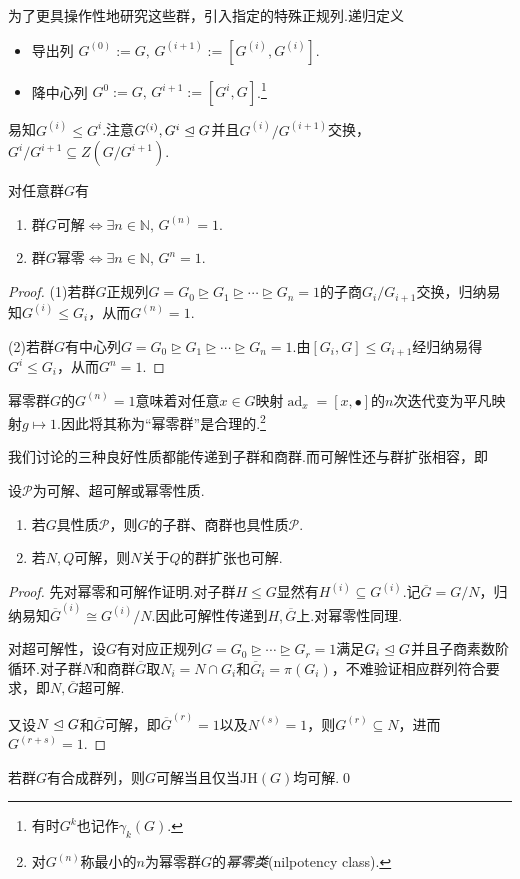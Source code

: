 为了更具操作性地研究这些群，引入指定的特殊正规列.递归定义
\begin{itemize}
	\item {\heiti 导出列} $G^{(0)}:=G,\,G^{(i+1)}:=[G^{(i)},G^{(i)}]$.
	\item {\heiti 降中心列} $G^0:=G,\,G^{i+1}:=[G^i,G]$.\footnote{有时$G^k$也记作$\gamma_k(G)$.}
\end{itemize}


易知$G^{(i)}\le G^i$.注意$G^{(i)},G^i\trianglelefteq G$并且$G^{(i)}/G^{(i+1)}$交换，$G^i/G^{i+1}\subseteq Z(G/G^{i+1})$.
\begin{prop}
	对任意群$G$有
	\begin{enumerate}
		\item 群$G$可解$\iff\exists n\in\mathbb{N},\,G^{(n)}=1$.
		\item 群$G$幂零$\iff\exists n\in\mathbb{N},\,G^n=1$.
	\end{enumerate}
\end{prop}
\begin{proof}
	\hspace*{5.4pt}(1)若群$G$正规列$G=G_0\trianglerighteq G_1\trianglerighteq\cdots\trianglerighteq G_n=1$的子商$G_{i}/G_{i+1}$交换，归纳易知$G^{(i)}\le G_i$，从而$G^{(n)}=1$.

	(2)若群$G$有中心列$G=G_0\trianglerighteq G_1\trianglerighteq\cdots\trianglerighteq G_n=1$.由$[G_i,G]\le G_{i+1}$经归纳易得$G^i\le G_i$，从而$G^n=1$.
\end{proof}
\begin{remark}
	幂零群$G$的$G^{(n)}=1$意味着对任意$x\in G$映射$\operatorname*{ad}_x=[x,\bullet]$的$n$次迭代变为平凡映射$g\mapsto 1$.因此将其称为“幂零群”是合理的.\footnote{对$G^{(n)}$称最小的$n$为幂零群$G$的\emph{幂零类}(nilpotency class).}
\end{remark}



我们讨论的三种良好性质都能传递到子群和商群.而可解性还与群扩张相容，即
\begin{prop}
	设$\mathcal{P}$为可解、超可解或幂零性质.
	\begin{enumerate}
		\item 若$G$具性质$\mathcal{P}$，则$G$的子群、商群也具性质$\mathcal{P}$.
		\item 若$N,Q$可解，则$N$关于$Q$的群扩张也可解.
	\end{enumerate}
\end{prop}
\begin{proof}
	先对幂零和可解作证明.对子群$H\le G$显然有$H^{(i)}\subseteq G^{(i)}$.记$\overline{G}=G/N$，归纳易知$\overline{G}^{(i)}\cong G^{(i)}/N$.因此可解性传递到$H,\overline{G}$上.对幂零性同理.

	对超可解性，设$G$有对应正规列$G=G_0\trianglerighteq\cdots\trianglerighteq G_r=1$满足$G_i\trianglelefteq G$并且子商素数阶循环.对子群$N$和商群$\overline{G}$取$N_i=N\cap G_i$和$\overline{G}_i=\pi(G_i)$，不难验证相应群列符合要求，即$N,\overline{G}$超可解.
	
	又设$N\trianglelefteq G$和$\overline{G}$可解，即$\overline{G}^{(r)}=1$以及$N^{(s)}=1$，则$G^{(r)}\subseteq N$，进而$G^{(r+s)}=1$.
\end{proof}
\begin{cor*}
	若群$G$有合成群列，则$G$可解当且仅当$\mathrm{JH}(G)$均可解.\qed
\end{cor*}

